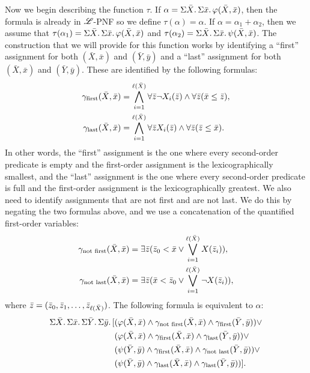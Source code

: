 Now we begin describing the function $\tau$. If $\alpha = \Sigma{\bar{X}}.\,\Sigma{\bar{x}}.\,\varphi(\bar{X},\bar{x})$, then the formula is already in $\mathscr{L}$-PNF so we define $\tau(\alpha) = \alpha$. If $\alpha = \alpha_1 + \alpha_2$, then we assume that $\tau(\alpha_1) = \Sigma{\bar{X}}.\,\Sigma{\bar{x}}.\,\varphi(\bar{X},\bar{x})$ and $\tau(\alpha_2) = \Sigma{\bar{X}}.\,\Sigma{\bar{x}}.\,\psi(\bar{X},\bar{x})$. The construction that we will provide for this function works by identifying a ``first'' assignment for both $(\bar{X},\bar{x})$ and $(\bar{Y},\bar{y})$ and a ``last'' assignment for both $(\bar{X},\bar{x})$ and $(\bar{Y},\bar{y})$. These are identified by the following formulas:
\begin{align*}
\gamma_{\text{first}}(\bar{X},\bar{x}) &= \bigwedge_{i = 1}^{\ell(\bar{X})} \forall\bar{z}\neg X_i(\bar{z}) \wedge \forall\bar{z}(\bar{x}\leq\bar{z}), \\
\gamma_{\text{last}}(\bar{X},\bar{x}) &= \bigwedge_{i = 1}^{\ell(\bar{X})} \forall\bar{z} X_i(\bar{z}) \wedge \forall\bar{z}(\bar{z}\leq\bar{x}).
\end{align*}
In other words, the ``first'' assignment is the one where every second-order predicate is empty and the first-order assignment is the lexicographically smallest, and the ``last'' assignment is the one where every second-order predicate is full and the first-order assignment is the lexicographically greatest. We also need to identify assignments that are not first and are not last. We do this by negating the two formulas above, and we use a concatenation of the quantified first-order variables:
\begin{align*}
\gamma_{\text{not first}}(\bar{X},\bar{x}) &= \exists\bar{z}(\bar{z}_0 < \bar{x} \vee \bigvee_{i = 1}^{\ell(\bar{X})}X(\bar{z}_i)), \\
\gamma_{\text{not last}}(\bar{X},\bar{x}) &= \exists\bar{z}(\bar{x} < \bar{z}_0 \vee \bigvee_{i = 1}^{\ell(\bar{X})}\neg X(\bar{z}_i)),
\end{align*}
where $\bar{z} = (\bar{z}_0,\bar{z}_1,\ldots,\bar{z}_{\ell(\bar{X})})$. The following formula is equivalent to $\alpha$:
\begin{align}
\Sigma{\bar{X}}.\,\Sigma{\bar{x}}.\,\Sigma{\bar{Y}}.\,\Sigma{\bar{y}}.\,[&(\varphi(\bar{X},\bar{x})\wedge\gamma_{\text{not first}}(\bar{X},\bar{x})\wedge\gamma_{\text{first}}(\bar{Y},\bar{y}))\vee\\
&(\varphi(\bar{X},\bar{x})\wedge\gamma_{\text{first}}(\bar{X},\bar{x})\wedge\gamma_{\text{last}}(\bar{Y},\bar{y}))\vee\\
&(\psi(\bar{Y},\bar{y})\wedge\gamma_{\text{first}}(\bar{X},\bar{x})\wedge\gamma_{\text{not last}}(\bar{Y},\bar{y}))\vee\\
&(\psi(\bar{Y},\bar{y})\wedge\gamma_{\text{last}}(\bar{X},\bar{x})\wedge\gamma_{\text{last}}(\bar{Y},\bar{y}))].
\end{align}
